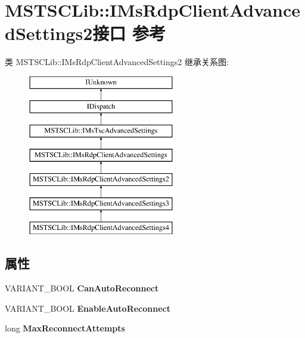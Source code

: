\hypertarget{interface_m_s_t_s_c_lib_1_1_i_ms_rdp_client_advanced_settings2}{}\section{M\+S\+T\+S\+C\+Lib\+:\+:I\+Ms\+Rdp\+Client\+Advanced\+Settings2接口 参考}
\label{interface_m_s_t_s_c_lib_1_1_i_ms_rdp_client_advanced_settings2}
类 M\+S\+T\+S\+C\+Lib\+:\+:I\+Ms\+Rdp\+Client\+Advanced\+Settings2 继承关系图\+:\begin{figure}[H]
\begin{center}
\leavevmode
\includegraphics[height=7.000000cm]{interface_m_s_t_s_c_lib_1_1_i_ms_rdp_client_advanced_settings2}
\end{center}
\end{figure}
\subsection*{属性}
\begin{DoxyCompactItemize}
\item 
\mbox{\label{interface_m_s_t_s_c_lib_1_1_i_ms_rdp_client_advanced_settings2_a53078e0ba8f283f3f1e96e27cade944c}} 
V\+A\+R\+I\+A\+N\+T\+\_\+\+B\+O\+OL {\bfseries Can\+Auto\+Reconnect}
\item 
\mbox{\label{interface_m_s_t_s_c_lib_1_1_i_ms_rdp_client_advanced_settings2_ae2b89bb60a5829f988664bd70778a84c}} 
V\+A\+R\+I\+A\+N\+T\+\_\+\+B\+O\+OL {\bfseries Enable\+Auto\+Reconnect}
\item 
\mbox{\label{interface_m_s_t_s_c_lib_1_1_i_ms_rdp_client_advanced_settings2_af0a6d6ffce31f1ed67ea2db81bde8ef7}} 
long {\bfseries Max\+Reconnect\+Attempts}
\end{DoxyCompactItemize}
